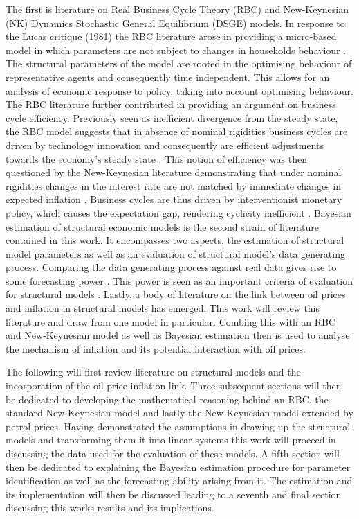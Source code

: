 \documentclass[12pt,a4paper,english]{article} %
\begin{document}
	 The first is literature on Real Business Cycle Theory (RBC) and New-Keynesian (NK) Dynamics Stochastic General Equilibrium (DSGE) models. In response to the Lucas critique (1981) the RBC literature arose in providing a micro-based model in which parameters are not subject to changes in households behaviour \cite{lucas_jr_tobin_1981}. The structural parameters of the model are rooted in the optimising behaviour of representative agents and consequently time independent. This allows for an analysis of economic response to policy, taking into account optimising behaviour. The RBC literature further contributed in providing an argument on business cycle efficiency. Previously seen as inefficient divergence from the steady state, the RBC model suggests that in absence of nominal rigidities business cycles are driven by technology innovation and consequently are efficient adjustments towards the economy's steady state \cite{christiano_current_1992}. 
	 This notion of efficiency was then questioned by the New-Keynesian literature demonstrating that under nominal rigidities changes in the interest rate are not matched by immediate changes in expected inflation \cite{gali_monetary_2008}. Business cycles are thus driven by interventionist monetary policy, which causes the expectation gap, rendering cyclicity inefficient \cite{gali_monetary_2008}.	 
	 Bayesian estimation of structural economic models is the second strain of literature contained in this work. It encompasses two aspects, the estimation of structural model parameters as well as an evaluation of structural model's data generating process. Comparing the data generating process against real data gives rise to some forecasting power \cite{del_negro_forming_2008}. This power is seen as an important criteria of evaluation for structural models \cite{kocherlakota_model_2007}. 	 
	 Lastly, a body of literature on the link between oil prices and inflation in structural models has emerged. This work will review this literature and draw from one model in particular. Combing this with an RBC and New-Keynesian model as well as Bayesian estimation then is used to analyse the mechanism of inflation and its potential interaction with oil prices. 
	 
	 The following will first review literature on structural models and the incorporation of the oil price inflation link. Three subsequent sections will then be dedicated to developing the mathematical reasoning behind an RBC, the standard New-Keynesian model and lastly the New-Keynesian model extended by petrol prices. Having demonstrated the assumptions in drawing up the structural models and transforming them it into linear systems this work will proceed in discussing the data used for the evaluation of these models. 
	 A fifth section will then be dedicated to explaining the Bayesian estimation procedure for parameter identification as well as the forecasting ability arising from it. The estimation and its implementation will then be discussed leading to a seventh and final section discussing this works results and its implications.
	 
\end{document}
